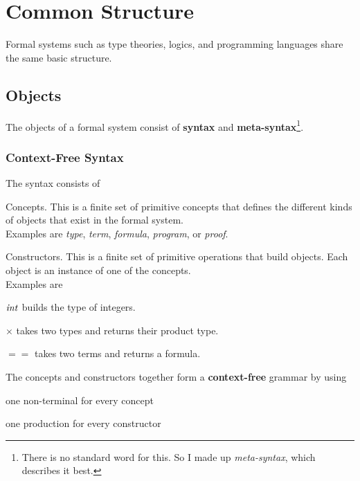 \section{Common Structure}\label{sec:sd:typetheory:common}

Formal systems such as type theories, logics, and programming languages share the same basic structure.

\subsection{Objects}

The objects of a formal system consist of \textbf{syntax} and \textbf{meta-syntax}\footnote{There is no standard word for this. So I made up \emph{meta-syntax}, which describes it best.}.

\subsubsection{Context-Free Syntax}

The syntax consists of
\begin{compactitem}
 \item Concepts. This is a finite set of primitive concepts that defines the different kinds of objects that exist in the formal system.\\
 Examples are \emph{type}, \emph{term}, \emph{formula}, \emph{program}, or \emph{proof}.
 \item Constructors. This is a finite set of primitive operations that build objects. Each object is an instance of one of the concepts.\\
 Examples are
   \begin{compactitem}
    \item $\mathit{int}$ builds the type of integers.
    \item $\times$ takes two types and returns their product type.
    \item $==$ takes two terms and returns a formula.
   \end{compactitem}
\end{compactitem}
The concepts and constructors together form a \textbf{context-free} grammar by using
\begin{compactitem}
 \item one non-terminal for every concept
 \item one production for every constructor
\end{compactitem}

